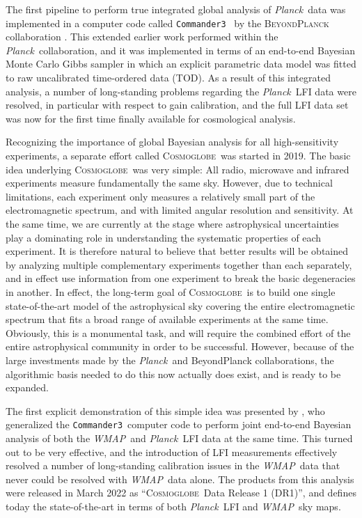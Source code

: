 \documentclass{aa}
\def\Cosmoglobe{\textsc{Cosmoglobe}}
\def\commanderthree{\texttt{Commander3}}
\def\Planck{\textit{Planck}}
\def\WMAP{\textit{WMAP}}
\begin{document}
The first pipeline to perform true integrated global analysis of \Planck\ data was implemented in a computer code called \commanderthree\ \citep{bp03} by the \textsc{BeyondPlanck} collaboration \citep{bp01}. This extended earlier work performed within the \Planck\ collaboration, and it was implemented in terms of an end-to-end Bayesian Monte Carlo Gibbs sampler in which an explicit parametric data model was fitted to raw uncalibrated time-ordered data (TOD). As a result of this integrated analysis, a number of long-standing problems regarding the \Planck\ LFI data were resolved, in particular with respect to gain calibration, and the full LFI data set was now for the first time finally available for cosmological analysis.

Recognizing the importance of global Bayesian analysis for all high-sensitivity experiments, a separate effort called \Cosmoglobe\ was started in 2019. The basic idea underlying \Cosmoglobe\ was very simple: All radio, microwave and infrared experiments measure fundamentally the same sky. However, due to technical limitations, each experiment only measures a relatively small part of the electromagnetic spectrum, and with limited angular resolution and sensitivity. At the same time, we are currently at the stage where astrophysical uncertainties play a dominating role in understanding the systematic properties of each experiment. It is therefore natural to believe that better results will be obtained by analyzing multiple complementary experiments together than each separately, and in effect use information from one experiment to break the basic degeneracies in another. In effect, the long-term goal of \Cosmoglobe\ is to build one single state-of-the-art model of the astrophysical sky covering the entire electromagnetic spectrum that fits a broad range of available experiments at the same time. Obviously, this is a monumental task, and will require the combined effort of the entire astrophysical community in order to be successful. However, because of the large investments made by the \Planck\ and BeyondPlanck collaborations, the algorithmic basis needed to do this now actually does exist, and is ready to be expanded.

The first explicit demonstration of this simple idea was presented by \citet{watts2023_dr1}, who generalized the \commanderthree\ computer code to perform joint end-to-end Bayesian analysis of both the \WMAP\ and \Planck\ LFI data at the same time. This turned out to be very effective, and the introduction of LFI measurements effectively resolved a number of long-standing calibration issues in the \WMAP\ data that never could be resolved with \WMAP\ data alone. The products from this analysis were released in March 2022 as ``\Cosmoglobe\ Data Release 1 (DR1)'', and defines today the state-of-the-art in terms of both \Planck\ LFI and \WMAP\ sky maps.
\end{document}
